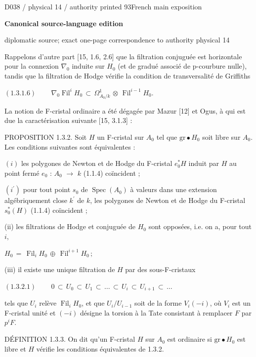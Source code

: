 \documentclass[9pt]{article}
\newcommand{\CanonText}[1]{\par{\fontsize{8.0}{9.35}\selectfont\RaggedRight #1\par}\vspace{2.2pt}}
\newcommand{\CanonDisplay}[1]{\par\vspace{1.2pt}\begin{center}{\fontsize{7.2}{8.4}\selectfont\(\displaystyle #1\)}\end{center}\vspace{1.2pt}}
\newcommand{\LayerTitle}{Canonical source-language edition}
\begin{document}
\noindent\begin{minipage}[t][\dimexpr\textheight-5pt\relax][t]{\textwidth}
{\sffamily\fontsize{7.3}{8.2}\selectfont\color{Quiet} D038 / physical 14 / authority printed 93\hfill French main exposition}
\par{}\vspace{4.5pt}
{\sffamily\fontsize{10.4}{11.6}\selectfont\bfseries\color{Accent} \LayerTitle}
\par{\sffamily\fontsize{6.7}{7.7}\selectfont\color{Quiet} diplomatic source; exact one-page correspondence to authority physical 14}
\vspace{5pt}
\CanonText{Rappelons d'autre part [15, 1.6, 2.6] que la filtration conjuguée est horizontale pour la connexion \(\nabla{}_{0}\) induite sur \(H_{0}\) (et de gradué associé de p-courbure nulle), tandis que la filtration de Hodge vérifie la condition de transversalité de Griffiths}
\CanonDisplay{(1.3.1.6)\qquad\,\nabla{}_{0}\operatorname{Fil}^{i}H_{0}\,\subset{}\,\Omega{}^{1}_{A_{0}/k}\,\otimes{}\,\operatorname{Fil}^{i-1}H_{0}.}
\CanonText{La notion de F-cristal ordinaire a été dégagée par Mazur [12] et Ogus, à qui est due la caractérisation suivante [15, 3.1.3] :}
\CanonText{PROPOSITION 1.3.2. Soit \(H\) un F-cristal sur \(A_{0}\) tel que \(\text{gr}\bullet{}H_{0}\) soit libre sur \(A_{0}\). Les conditions suivantes sont équivalentes :}
\CanonText{\((i)\) les polygones de Newton et de Hodge du F-cristal \(e_{0}^{*}H\) induit par \(H\) au point fermé \(e_{0}\) : \(A_{0}\) \(\to{}\) \(k\) (1.1.4) coïncident ;}
\CanonText{\((i^{\prime})\) pour tout point \(s_{0}\) de \(\operatorname{Spec}(A_{0})\) à valeurs dans une extension algébriquement close \(k^{\prime}\) de \(k\), les polygones de Newton et de Hodge du F-cristal \(s_{0}^{*}(H)\) (1.1.4) coïncident ;}
\CanonText{(ii) les filtrations de Hodge et conjuguée de \(H_{0}\) sont opposées, i.e. on a, pour tout \(i\),}
\CanonDisplay{H_{0}\,=\,\operatorname{Fil}_{i}H_{0}\,\oplus{}\,\operatorname{Fil}^{i+1}H_{0}\,;}
\CanonText{(iii) il existe une unique filtration de \(H\) par des sous-F-cristaux}
\CanonDisplay{(1.3.2.1)\qquad\,0\,\subset{}\,U_{0}\,\subset{}\,U_{1}\,\subset{}\,\ldots{}\,\subset{}\,U_{i}\,\subset{}\,U_{i+1}\,\subset{}\,\ldots{}}
\CanonText{tels que \(U_{i}\) relève \(\operatorname{Fil}_{i}H_{0}\), et que \(U_{i}/U_{i-1}\) soit de la forme \(V_{i}(-i)\), où \(V_{i}\) est un F-cristal unité et \((-i)\) désigne la torsion à la Tate consistant à remplacer \(F\) par \(p^{i}F\).}
\CanonText{DÉFINITION 1.3.3. On dit qu'un F-cristal \(H\) sur \(A_{0}\) est ordinaire si \(\text{gr}\bullet{}H_{0}\) est libre et \(H\) vérifie les conditions équivalentes de 1.3.2.}

\end{minipage}
\end{document}
